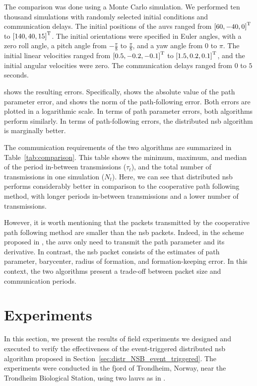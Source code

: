 The comparison was done using a Monte Carlo simulation.
We performed ten thousand simulations with randomly selected initial conditions and communication delays.
The initial positions of the \glspl{auv} ranged from $\left[60,-40,0\right]^{\mathrm{T}}$ to $\left[140,40,15\right]^{\mathrm{T}}$.
The initial orientations were specified in Euler angles, with a zero roll angle, a pitch angle from $-\frac{\pi}{8}$ to $\frac{\pi}{8}$, and a yaw angle from $0$ to $\pi$.
The initial linear velocities ranged from $\left[0.5, -0.2, -0.1\right]^{\mathrm{T}}$ to $\left[1.5, 0.2, 0.1\right]^{\mathrm{T}}$, and the initial angular velocities were zero.
The communication delays ranged from $0$ to $5$ seconds.

 shows the resulting errors.
Specifically,  shows the absolute value of the path parameter error, and  shows the norm of the path-following error.
Both errors are plotted in a logarithmic scale.
In terms of path parameter errors, both algorithms perform similarly.
In terms of path-following errors, the distributed \gls{nsb} algorithm is marginally better.

The communication requirements of the two algorithms are summarized in Table~\ref{tab:comparison}.
This table shows the minimum, maximum, and median of the period in-between transmissions ($\tau_t$), and the total number of transmissions in one simulation ($N_t$).
Here, we can see that distributed \gls{nsb} performs considerably better in comparison to the cooperative path following method, with longer periods in-between transmissions and a lower number of transmissions.

However, it is worth mentioning that the packets transmitted by the cooperative path following method are smaller than the \gls{nsb} packets.
Indeed, in the scheme proposed in \cite{praveen_cooperative_2018}, the \glspl{auv} only need to transmit the path parameter and its derivative.
In contrast, the \gls{nsb} packet consists of the estimates of path parameter, barycenter, radius of formation, and formation-keeping error.
In this context, the two algorithms present a trade-off between packet size and communication periods.



\section{Experiments}
\label{sec:distr_NSB_experiments}
In this section, we present the results of field experiments we designed and executed to verify the effectiveness of the event-triggered distributed \gls{nsb} algorithm proposed in Section~\ref{sec:distr_NSB_event_triggered}.
The experiments were conducted in the fjord of Trondheim, Norway, near the Trondheim Biological Station, using two \glspl{lauv} as in .


